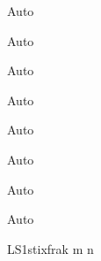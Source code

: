 \newcommand{\DeclareAutoPairedDelimiter}[3]{
	\expandafter\DeclarePairedDelimiter\csname Auto\string#1\endcsname{#2}{#3}
	\DeclareRobustCommand{#1}{\csname Auto\string#1\endcsname*}}

\DeclareAutoPairedDelimiter{\paren}{ ( }{ ) }			%
\DeclareAutoPairedDelimiter{\bracket}{ [ }{ ] }			%
\DeclareAutoPairedDelimiter{\curly}{ \{ }{ \} }			%
\DeclareAutoPairedDelimiter{\abs}{|}{|}					%
\DeclareAutoPairedDelimiter{\norm}{\|}{\|}				%
\DeclareAutoPairedDelimiter{\ip}{\langle}{\rangle}		%
\DeclareAutoPairedDelimiter{\ceil}{\lceil}{\rceil} 		%
\DeclareAutoPairedDelimiter{\floor}{\lfloor}{\rfloor} 	%

\newcommand{\nada}{\varnothing} %
\newcommand{\C}{\mathbb{C}}		%
\newcommand{\F}{\mathbb{F}}		%
\newcommand{\K}{\mathbb{K}}		%
\newcommand{\N}{\mathbb{N}}		%
\renewcommand{\P}{\mathbb{P}}		%
\newcommand{\Q}{\mathbb{Q}}		%
\newcommand{\R}{\mathbb{R}}		%
\newcommand{\Z}{\mathbb{Z}}		%


      {LS1}{stixfrak} {m} {n}
\newcommand{\subseto}{\mathop{\,\subsetocirc\,}}

\newcommand\inv{^{-1}} %

\newcommand{\ii}{\mathfrak{i}} 	%
\renewcommand\Re{\text{Re}\,}
\renewcommand\Im{\text{Im}\,}

